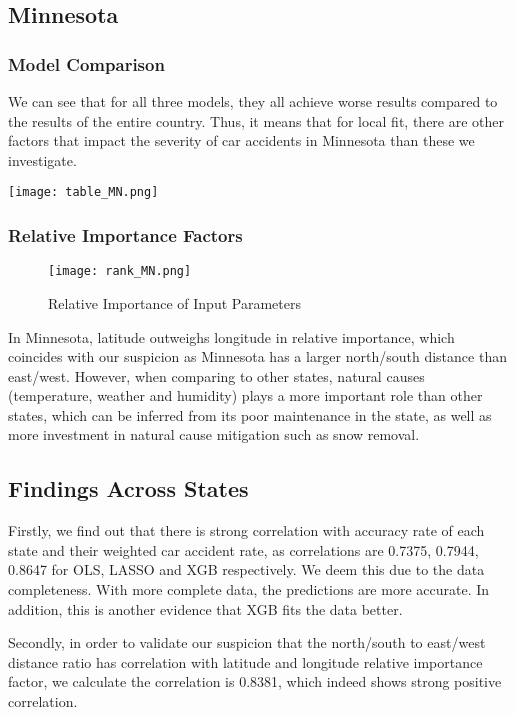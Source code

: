 \documentclass[twocolumn]{article}
\begin{document}
\subsection{Minnesota}
\subsubsection{Model Comparison}
We can see that for all three models, they all achieve worse results compared to the results of the entire country. Thus, it means that for local fit, there are other factors that impact the severity of car accidents in Minnesota than these we investigate. 
\begin{table}[h]
    \centering
    \texttt{[image: table\_MN.png]}
    \caption{}
\end{table}
\subsubsection{Relative Importance Factors}
\begin{figure}[h]
    \centering
    \texttt{[image: rank\_MN.png]}
    \caption{Relative Importance of Input Parameters}
\end{figure}
In Minnesota, latitude outweighs longitude in relative importance, which coincides with our suspicion as Minnesota has a larger north/south distance than east/west. However, when comparing to other states, natural causes (temperature, weather and humidity) plays a more important role than other states, which can be inferred from its poor maintenance in the state, as well as more investment in natural cause mitigation such as snow removal.  

\subsection{Findings Across States}
Firstly, we find out that there is strong correlation with accuracy rate of each state and their weighted car accident rate, as correlations are 0.7375, 0.7944, 0.8647 for OLS, LASSO and XGB respectively. We deem this due to the data completeness. With more complete data, the predictions are more accurate. In addition, this is another evidence that XGB fits the data better. 

Secondly, in order to validate our suspicion that the north/south to east/west distance ratio has correlation with latitude and longitude relative importance factor, we calculate the correlation is 0.8381, which indeed shows strong positive correlation. 
\end{document}
